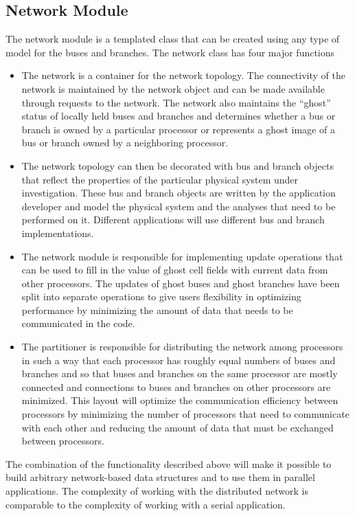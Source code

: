 \documentclass[preprint]{acm_proc_article-sp}
\begin{document}
\subsection{Network Module}
The network module is a templated class that can be created using any type of
model for the buses and branches. The network class has four major functions
\begin{itemize}
\item The network is a container for the network topology. The connectivity of the network
is maintained by the network object and can be made available through requests to the
network. The network also maintains the ``ghost'' status of locally held buses and
branches and determines whether a bus or branch is owned by a particular processor or
represents a ghost image of a bus or branch owned by a neighboring processor.

\item The network topology can then be decorated with bus and branch objects that reflect
the properties of the particular physical system under investigation. These bus and
branch objects are written by the application developer and model the
physical system and the analyses that need to be performed on it.
Different applications will use different bus and branch implementations.

\item The network module is responsible for implementing update operations that can be
used to fill in the value of ghost cell fields with current data from other processors.
The updates of ghost buses and ghost branches have been split into separate operations to
give users flexibility in optimizing performance by minimizing the amount of data that
needs to be communicated in the code.

\item The partitioner is responsible for distributing the network among
processors in such a way that each processor has roughly equal numbers of buses and
branches and so that buses and branches on the same processor are
mostly connected and connections to buses and branches on other processors are
minimized. This layout will optimize the communication efficiency between processors by
minimizing the number of processors that need to communicate with each other and
reducing the amount of data that must be exchanged between processors.
\end{itemize}

The combination of the functionality described above will make it possible to
build arbitrary network-based data structures and to use them in parallel
applications. The complexity of working with
the distributed network is comparable to the complexity of working with a serial
application.
\end{document}
